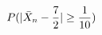 \documentclass[preview]{standalone}
\begin{document}
\begin{align*}
\special{dvisvgm:raw <g id='unique000'>}P(|\bar X_n-\frac72|\ge\frac1{10})\special{dvisvgm:raw </g>}
\end{align*}
\end{document}

